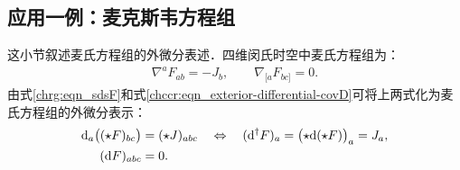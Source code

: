 
\subsection{应用一例：麦克斯韦方程组}

这小节叙述麦氏方程组的外微分表述．四维闵氏时空中麦氏方程组为：
\begin{align*}
	\nabla^a F_{ab} = - J_b, \qquad	\nabla_{[a} F_{bc]} = 0 . 
\end{align*}
由式\eqref{chrg:eqn_sdsF}和式\eqref{chccr:eqn_exterior-differential-covD}可将上两式化为麦氏方程组的外微分表示：
\begin{subequations}\label{chrg:eqn_Maxwell-ext-diff}
	\begin{align}
		{\rm d}_a \bigl((\star F)_{bc} \bigr)&= (\star J)_{abc}  \quad \Leftrightarrow \quad
		({\rm d}^\dagger F)_a = \bigl(\star {\rm d}(\star F) \bigr)_a = J_a , 
		\label{chrg:eqn_Maxwell-ext-diff-1} \\
		({\rm d} F)_{abc} &= 0.      \label{chrg:eqn_Maxwell-ext-diff-2}
	\end{align}
\end{subequations}


